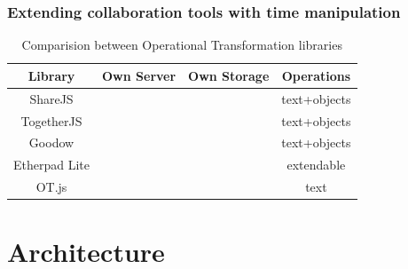 \documentclass[compress]{beamer}
\newcommand{\cmark}{\color{green}\ding{51}}%
\newcommand{\xmark}{\color{red}\ding{55}}%
\begin{document}
  		\begin{frame}[c]
		\frametitle{Extending collaboration tools with time manipulation}

			\begin{table}
			\centering
			\caption{Comparision between Operational Transformation libraries}
			\label{table:otcomparision}
			\begin{tabular}{|c|c|c|c|}
			\hline
			\textbf{Library} & \textbf{Own Server} & \textbf{Own Storage} & \textbf{Operations} \\ \hline
			ShareJS          & \cmark                 & \cmark                  & text+objects        \\ \hline
			TogetherJS       & \cmark                 & \xmark                   & text+objects        \\ \hline
			Goodow           & \cmark                 & \cmark                  & text+objects        \\ \hline
			Etherpad Lite    & \cmark                 & \cmark                  & extendable 			    \\ \hline
			OT.js            & \xmark                  & \xmark                   & text                \\ \hline
			\end{tabular}
			\end{table}

		\end{frame}




\section{Architecture}\label{arch}
\end{document}
